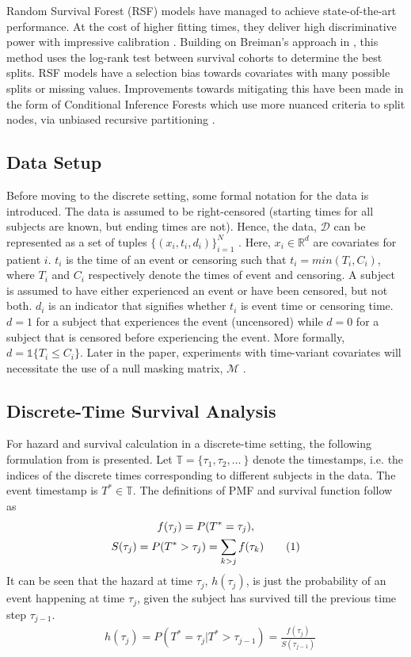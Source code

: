 \documentclass[%
 twocolumn,
 reprint,
 amsmath,amssymb,
 aps,nofootinbib
]{revtex4-2}
\newcommand\numberthis{\addtocounter{equation}{1}\tag{\theequation}} %
\begin{document}
Random Survival Forest (RSF) models have managed to achieve state-of-the-art performance. At the cost of higher fitting times, they deliver high discriminative power with impressive calibration \cite{rsf}. Building on Breiman's approach in \cite{rf}, this method uses the log-rank test between survival cohorts to determine the best splits. RSF models have a selection bias towards covariates with many possible splits or missing values. Improvements towards mitigating this have been made in the form of Conditional Inference Forests which use more nuanced criteria to split nodes, via unbiased recursive partitioning \cite{cit}.

\subsection{\label{setting}Data Setup}
Before moving to the discrete setting, some formal notation for the data is introduced. The data is assumed to be right-censored (starting times for all subjects are known, but ending times are not). Hence, the data, $\mathcal{D}$ can be represented as a set of tuples $\{(x_i , t_i , d_i)\}_{i=1}^{N}$  \cite{nagpal_deep_2021}. Here, $x_i \in \mathbb{R}^d$ are covariates for patient $i$. $t_i$ is the time of an event or censoring such that $t_i = min(T_i, C_i)$, where $T_i$ and $C_i$ respectively denote the times of event and censoring. A subject is assumed to have either experienced an event or have been censored, but not both. $d_i$ is an indicator that signifies whether $t_i$ is event time or censoring time. $d=1$ for a subject that experiences the event (uncensored) while $d=0$ for a subject that is censored before experiencing the event. More formally, $d= \mathds{1}\{T_i \le C_i\}$. Later in the paper, experiments with time-variant covariates will necessitate the use of a null masking matrix, $\mathcal{M}$ \cite{deephit}.\\

\subsection{\label{discrete}Discrete-Time Survival Analysis}
For hazard and survival calculation in a discrete-time setting, the following formulation from \cite{kvamme_continuous_2019} is presented. Let $\mathbb{T} = \{\tau_1, \tau_2, \ldots\ \}$ denote the timestamps, i.e. the indices of the discrete times corresponding to different subjects in the data. The event timestamp is $T^*\in\mathbb{T}$. The definitions of PMF and survival function follow as
\begin{gather*}
f(\tau_j) = P(T^* = \tau_j),\\
S(\tau_j) = P(T^* >\tau_j) = \sum_{k>j}f(\tau_k) \numberthis  \label{eq:surv_pmf}
\end{gather*}
It can be seen that the hazard at time $\tau_j$, $h(\tau_j)$, is just the probability of an event happening at time $\tau_j$, given the subject has survived till the previous time step $\tau_{j-1}$. 
\begin{align}
&h(\tau_j) = P(T^* = \tau_j | T^* > \tau_{j-1}) = \frac{f(\tau_j)}{S(\tau_{j-1})} \label{eq:haz_cond_proba}
\end{align}
\end{document}
